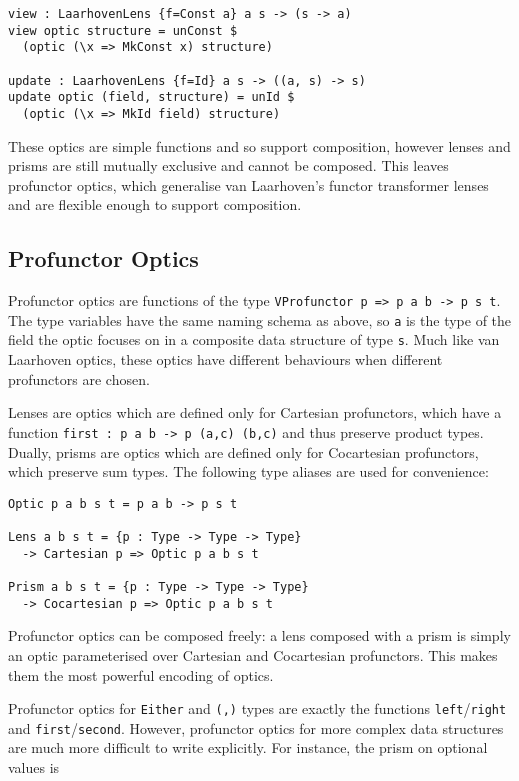 \documentclass[11pt]{report}
\begin{document}
\begin{spacing}{1.15}
\begin{verbatim}
view : LaarhovenLens {f=Const a} a s -> (s -> a)
view optic structure = unConst $
  (optic (\x => MkConst x) structure)

update : LaarhovenLens {f=Id} a s -> ((a, s) -> s)
update optic (field, structure) = unId $
  (optic (\x => MkId field) structure)
\end{verbatim}

These optics are simple functions and so support composition, however lenses and prisms are still mutually exclusive and cannot be composed. This leaves profunctor optics, which generalise van Laarhoven's functor transformer lenses and are flexible enough to support composition.

\subsection{Profunctor Optics}

Profunctor optics are functions of the type \texttt{VProfunctor p => p a b -> p s t}. The type variables have the same naming schema as above, so \texttt{a} is the type of the field the optic focuses on in a composite data structure of type \texttt{s}. Much like van Laarhoven optics, these optics have different behaviours when different profunctors are chosen.

Lenses are optics which are defined only for Cartesian profunctors, which have a function \texttt{first : p a b -> p (a,c) (b,c)} and thus preserve product types. Dually, prisms are optics which are defined only for Cocartesian profunctors, which preserve sum types. The following type aliases are used for convenience:

\begin{verbatim}
Optic p a b s t = p a b -> p s t

Lens a b s t = {p : Type -> Type -> Type}
  -> Cartesian p => Optic p a b s t

Prism a b s t = {p : Type -> Type -> Type}
  -> Cocartesian p => Optic p a b s t
\end{verbatim}

Profunctor optics can be composed freely: a lens composed with a prism is simply an optic parameterised over Cartesian and Cocartesian profunctors. This makes them the most powerful encoding of optics.

Profunctor optics for \texttt{Either} and \texttt{(,)} types are exactly the functions \texttt{left}/\texttt{right} and \texttt{first}/\texttt{second}. However, profunctor optics for more complex data structures are much more difficult to write explicitly. For instance, the prism on optional values is


\end{spacing}
\end{document}
